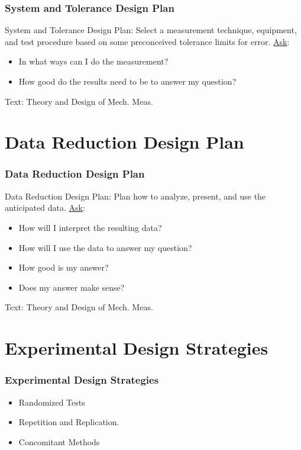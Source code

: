 \documentclass[fleqn]{beamer} %
\newcommand{\sectiontitleII}{System and Tolerance Design Plan}
\newcommand{\sectiontitleIII}{Data Reduction Design Plan}
\newcommand{\sectiontitleIV}{Experimental Design Strategies }
\begin{document}
\begin{frame}[label=sectionII]
\frametitle{\sectiontitleII}


{\PR System and Tolerance Design Plan}: Select a measurement technique, equipment, and
test procedure based on some preconceived tolerance limits for error. \vspc
\underline{Ask}:
\begin{itemize}
	\item In what ways can I do the measurement?
	\item How good do the results need to be to answer my
	question? 
\end{itemize} 

{\tiny Text: Theory and Design of Mech. Meas.}
\end{frame}

\section{\sectiontitleIII}

\begin{frame}[label=sectionIII]
\frametitle{\sectiontitleIII}

{\GR Data Reduction Design Plan}: Plan how to analyze, present, and use the anticipated data.\vspc
\underline{Ask}:
\begin{itemize}
	\item How will I interpret the resulting data?
	\item How will I use the data to answer my question?
	\item How good is my answer? 
	\item Does my answer make sense?
\end{itemize} 

{\tiny Text: Theory and Design of Mech. Meas.}
\end{frame}

\section{\sectiontitleIV}

\begin{frame}[label=sectionIV]
\frametitle{\sectiontitleIV}


\begin{itemize}
	\item {\BL Randomized} Tests \vspccc%
	\item {\GR Repetition} and {\PR Replication}. \vspccc%
	\item {\BR Concomitant} Methods \vspccc
\end{itemize}

\end{frame}
\end{document}
